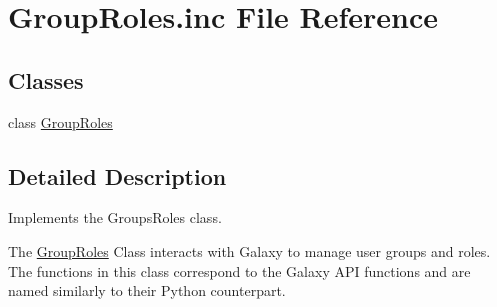 \hypertarget{GroupRoles_8inc}{}\section{Group\+Roles.\+inc File Reference}
\label{GroupRoles_8inc}
\subsection*{Classes}
\begin{DoxyCompactItemize}
\item 
class \hyperlink{classGroupRoles}{Group\+Roles}
\end{DoxyCompactItemize}


\subsection{Detailed Description}
Implements the Groups\+Roles class.

The \hyperlink{classGroupRoles}{Group\+Roles} Class interacts with Galaxy to manage user groups and roles. The functions in this class correspond to the Galaxy A\+PI functions and are named similarly to their Python counterpart. 